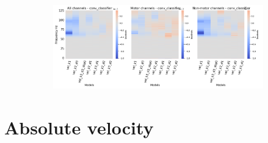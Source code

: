\begin{figure}[!htpb]
\begin{subfigure}[b]{\textwidth}
   \includegraphics[width=1\linewidth]{img/appendix/D/conv-classifier/hp-m/vel_model_gradients_all_kinds}
   \caption{}
   \label{fig:vel-pw-hp-grads-conv-classifier}
\end{subfigure}

\caption[]{}
\label{fig:vel-pw-hp-grads}
\end{figure}

\section*{Absolute velocity}\label{sec:absolute-velocity-appendixD}

